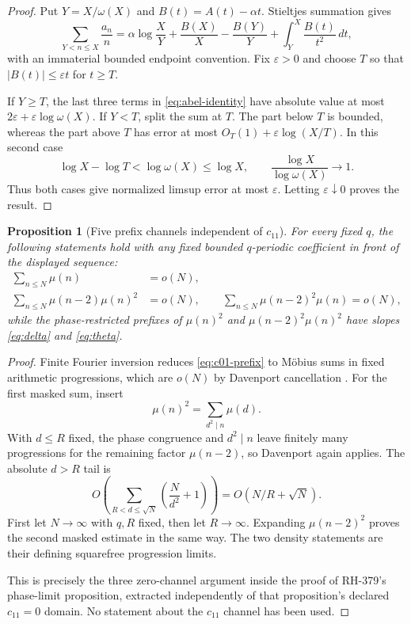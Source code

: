 \documentclass[11pt]{article}
\newtheorem{proposition}[theorem]{Proposition}
\theoremstyle{definition}
\theoremstyle{remark}
\newcommand{\mob}{\mu}
\begin{document}
\begin{proof}
Put $Y=X/\omega(X)$ and $B(t)=A(t)-\alpha t$.  Stieltjes summation gives
\begin{equation}
 \sum_{Y<n\le X}\frac{a_n}{n}
 =\alpha\log\frac XY
 +\frac{B(X)}X-\frac{B(Y)}Y
 +\int_Y^X\frac{B(t)}{t^2}\,dt,
 \label{eq:abel-identity}
\end{equation}
with an immaterial bounded endpoint convention.  Fix $\varepsilon>0$ and
choose $T$ so that $|B(t)|\le\varepsilon t$ for $t\ge T$.

If $Y\ge T$, the last three terms in \eqref{eq:abel-identity} have absolute
value at most $2\varepsilon+\varepsilon\log\omega(X)$.  If $Y<T$, split the
sum at $T$.  The part below $T$ is bounded, whereas the part above $T$ has
error at most $O_T(1)+\varepsilon\log(X/T)$.  In this second case
\[
 \log X-\log T<\log\omega(X)\le\log X,
 \qquad
 \frac{\log X}{\log\omega(X)}\longrightarrow1.
\]
Thus both cases give normalized limsup error at most $\varepsilon$.
Letting $\varepsilon\downarrow0$ proves the result.
\end{proof}

\begin{proposition}[Five prefix channels independent of $c_{11}$]
\label{prop:five-channels}
For every fixed $q$, the following statements hold with any fixed bounded
$q$-periodic coefficient in front of the displayed sequence:
\begin{align}
 \sum_{n\le N}\mob(n)&=o(N),
 \label{eq:c01-prefix}\\
 \sum_{n\le N}\mob(n-2)\mob(n)^2&=o(N),
 \qquad
 \sum_{n\le N}\mob(n-2)^2\mob(n)=o(N),
 \label{eq:masked-prefix}
\end{align}
while the phase-restricted prefixes of $\mob(n)^2$ and
$\mob(n-2)^2\mob(n)^2$ have slopes \eqref{eq:delta} and
\eqref{eq:theta}.
\end{proposition}

\begin{proof}
Finite Fourier inversion reduces \eqref{eq:c01-prefix} to M\"obius sums in
fixed arithmetic progressions, which are $o(N)$ by Davenport cancellation
\cite{Davenport1937}.  For the first masked sum, insert
\[
 \mob(n)^2=\sum_{d^2\mid n}\mob(d).
\]
With $d\le R$ fixed, the phase congruence and $d^2\mid n$ leave finitely
many progressions for the remaining factor $\mob(n-2)$, so Davenport again
applies.  The absolute $d>R$ tail is
\[
 O\left(\sum_{R<d\le\sqrt N}\left(\frac N{d^2}+1\right)\right)
 =O(N/R+\sqrt N).
\]
First let $N\to\infty$ with $q,R$ fixed, then let $R\to\infty$.  Expanding
$\mob(n-2)^2$ proves the second masked estimate in the same way.  The two
density statements are their defining squarefree progression limits.

This is precisely the three zero-channel argument inside the proof of
RH-379's phase-limit proposition, extracted independently of that
proposition's declared $c_{11}=0$ domain.  No statement about the
$c_{11}$ channel has been used.
\end{proof}
\end{document}
